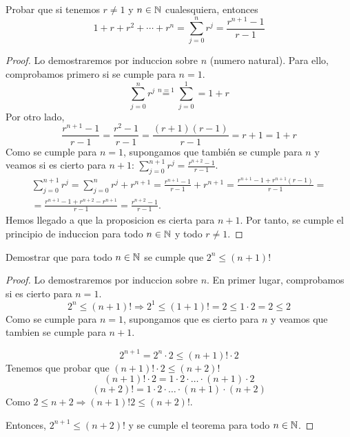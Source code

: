 \begin{example}
	Probar que si tenemos \(r \neq  1 \) y \(n \in  \mathbb{N}  \) cualesquiera, entonces
	\[
		1 + r + r^{2} + \cdots + r^{n} = \sum_{j=0}^{n } r^{j}  = \frac{r^{n+1 } - 1 }{r - 1}
	\]
\end{example}
\begin{proof}
	Lo demostraremos por induccion sobre \(n \) (numero natural). Para ello, comprobamos primero si se cumple para \(n = 1\).
	\[
		\sum_{j=0}^{n} r^{j } \overset{n=1}{=} \sum_{j=0}^{1} = 1 + r
	\]
	Por otro lado,
	\[
		\frac{r^{n+1}-1 }{r-1} = \frac{r^{2} - 1 }{r - 1} = \frac{(r+1)(r-1)}{r - 1} = r + 1 = 1 + r
	\]
	Como se cumple para \(n = 1\), supongamos que también se cumple para \(n \) y veamos si es cierto para \(n + 1\): \(\displaystyle \sum_{j=0}^{n+1} r^{j}  = \frac{r^{n+2} - 1 }{r - 1}\).
	\begin{multline*}
		\sum_{j=0}^{n+1} r^{j} = \sum_{j=0}^{n} r^{j} + r^{n+1} = \frac{r^{n+1} -1 }{r-1} + r^{n+1} = \frac{r^{n+1} - 1 + r^{n+1}(r-1)}{r-1} = \\
		= \frac{r^{n+1} - 1 + r^{n+2} - r^{n+1}}{r-1} = \boxed{\frac{r^{n+2} - 1 }{r -1}}.
	\end{multline*}
	Hemos llegado a que la proposicion es cierta para \(n + 1 \). Por tanto, se cumple el principio de induccion para todo \(n \in  \mathbb{N} \) y todo \( r \neq   1\).
\end{proof}

\begin{example}
	Demostrar que para todo \(n \in \mathbb{N}  \) se cumple que \(2^{n} \leq (n+1)! \)
\end{example}
\begin{proof}
	Lo demostraremos por induccion sobre \(n \). En primer lugar, comprobamos si es cierto para \(n = 1 \).
	\[
		2^{n} \leq (n+1)! \Rightarrow 2^{1} \leq (1+1)! = 2 \leq 1 \cdot 2 = 2 \leq 2
	\]
	Como se cumple para \(n = 1 \), supongamos que es cierto para \(n \) y veamos que tambien se cumple para \(n+1 \).
	
	\[
		2^{n+1} = 2^{n} \cdot 2 \leq (n+1)! \cdot 2
	\]
	Tenemos que probar que \((n+1)! \cdot 2 \leq (n+2)!\)
	\[
		(n+1)! \cdot 2 = 1 \cdot 2 \cdot \ldots \cdot (n+1) \cdot 2
	\]
	\[
		(n+2)! = 1 \cdot 2 \cdot \ldots \cdot (n+1) \cdot (n+2)
	\]
	Como \(2 \leq n +2 \Rightarrow (n+1)! 2 \leq (n+2)!\).
	
	Entonces, \(2^{n+1} \leq (n+2)! \) y se cumple el teorema para todo \(n \in  \mathbb{N} \).
\end{proof}


